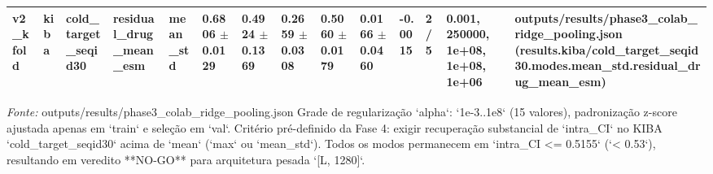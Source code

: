 \begin{table}[htbp]
\begin{tabular}{llllllllllllll}
v2\_kfold & kiba & cold\_target\_seqid30 & residual\_drug\_mean\_esm & mean\_std & 0.6806 $\pm$ 0.0129 & 0.4924 $\pm$ 0.1369 & 0.2659 $\pm$ 0.0308 & 0.5060 $\pm$ 0.0179 & 0.0166 $\pm$ 0.0460 & -0.0015 & 2/5 & 0.001, 250000, 1e+08, 1e+08, 1e+06 & outputs/results/phase3\_colab\_ridge\_pooling.json (results.kiba/cold\_target\_seqid30.modes.mean\_std.residual\_drug\_mean\_esm) \\
\bottomrule
\end{tabular}
\begin{flushleft}
\footnotesize \textit{Fonte:} outputs/results/phase3\_colab\_ridge\_pooling.json Grade de regularização `alpha`: `1e-3..1e8` (15 valores), padronização z-score ajustada apenas em `train` e seleção em `val`. Critério pré-definido da Fase 4: exigir recuperação substancial de `intra\_CI` no KIBA `cold\_target\_seqid30` acima de `mean` (`max` ou `mean\_std`). Todos os modos permanecem em `intra\_CI <= 0.5155` (`< 0.53`), resultando em veredito **NO-GO** para arquitetura pesada `[L, 1280]`.
\end{flushleft}
\end{table}
